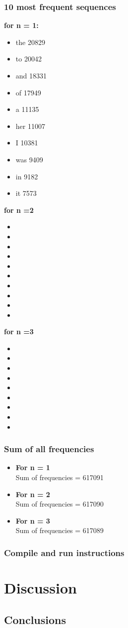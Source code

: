 \documentclass[final,12pt]{elsarticle}
\begin{document}
\subsubsection{10 most frequent sequences}
\textbf{for n = 1:}
\begin{itemize}
\item the 20829
\item to 20042
\item and 18331 
\item of 17949
\item a 11135
\item her 11007
\item I 10381
\item was 9409
\item in 9182 
\item it 7573
\end{itemize}
\textbf{for n =2}
\begin{itemize}
\item 
\item 
\item 
\item 
\item 
\item 
\item 
\item 
\item 
\item 
\end{itemize}
\textbf{for n =3}
\begin{itemize}
\item 
\item
\item
\item
\item
\item
\item
\item
\item
\end{itemize}
\subsubsection{Sum of all frequencies}
\begin{itemize}
\item \textbf{For n = 1}\\
Sum of frequencies = 617091
\item \textbf{For n = 2}\\
Sum of frequencies = 617090
\item \textbf{For n = 3}\\
Sum of frequencies = 617089
\end{itemize}
\subsubsection{Compile and run instructions}
\section{Discussion}
\subsection{Conclusions}
\end{document}
